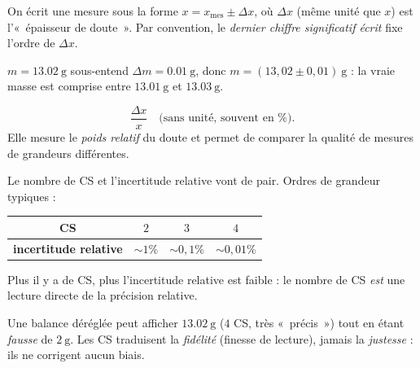 \documentclass[11pt,a4paper]{article}
\begin{document}
\begin{cle}
On écrit une mesure sous la forme $x=x_{\text{mes}}\pm\Delta x$, où $\Delta x$ (même unité que $x$) est
l'«~épaisseur de doute~». Par convention, le \emph{dernier chiffre significatif écrit} fixe l'ordre de
$\Delta x$.
\end{cle}

\begin{exemplebox}
$m=\qty{13,02}{\gram}$ sous-entend $\Delta m=\qty{0,01}{\gram}$, donc $m=(13,02\pm0,01)\ \si{\gram}$ : la
vraie masse est comprise entre $\qty{13,01}{\gram}$ et $\qty{13,03}{\gram}$.
\end{exemplebox}

\begin{cle}
\[ \frac{\Delta x}{x}\quad\text{(sans unité, souvent en \%)}. \]
Elle mesure le \emph{poids relatif} du doute et permet de comparer la qualité de mesures de grandeurs
différentes.
\end{cle}

\begin{exemplebox}
Le nombre de CS et l'incertitude relative vont de pair. Ordres de grandeur typiques :
\begin{center}\renewcommand{\arraystretch}{1.15}
\begin{tabular}{c c c c}
\toprule
\textbf{CS} & $2$ & $3$ & $4$\\
\midrule
\textbf{incertitude relative} & $\sim 1\%$ & $\sim 0,1\%$ & $\sim 0,01\%$\\
\bottomrule
\end{tabular}
\end{center}
Plus il y a de CS, plus l'incertitude relative est faible : le nombre de CS \emph{est} une lecture
directe de la précision relative.
\end{exemplebox}

\begin{piege}
Une balance déréglée peut afficher $\qty{13,02}{\gram}$ ($4$ CS, très «~précis~») tout en étant
\emph{fausse} de $\qty{2}{\gram}$. Les CS traduisent la \emph{fidélité} (finesse de lecture), jamais la
\emph{justesse} : ils ne corrigent aucun biais.
\end{piege}
\end{document}
